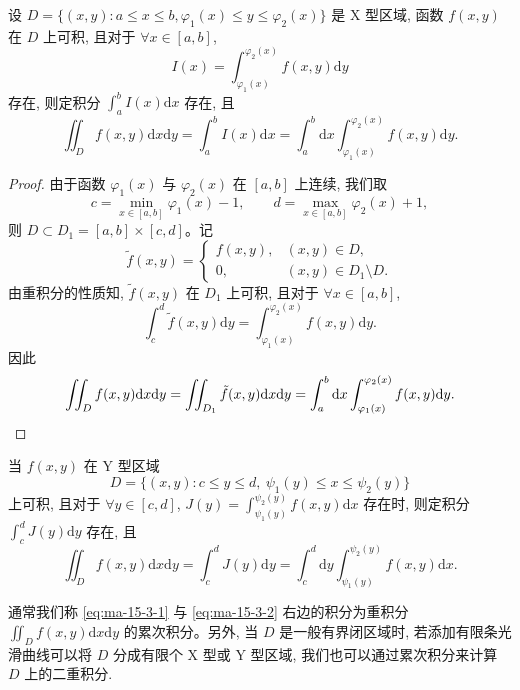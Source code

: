 \begin{theorem}\label{theorem:ma-15-3-2}
设 $D=\{(x,y):a\leqslant x\leqslant b,\varphi_1(x)\leqslant y\leqslant\varphi_2(x)\}$ 是 X 型区域, 函数 $f(x,y)$ 在 $D$ 上可积, 且对于 $\forall x\in[a,b]$,
\[
  I(x)=\int_{\varphi_1(x)}^{\varphi_2(x)}f(x,y)\mathrm dy
\]
存在, 则定积分 $\int_a^b I(x)\mathrm dx$ 存在, 且
\begin{equation}
  \iint_D f(x,y)\mathrm dx\mathrm dy
  =\int_a^b I(x)\mathrm dx
  =\int_a^b\mathrm dx\int_{\varphi_1(x)}^{\varphi_2(x)}f(x,y)\mathrm dy.
  \label{eq:ma-15-3-1}
\end{equation}
\end{theorem}


\begin{proof}
由于函数 $\varphi_1(x)$ 与 $\varphi_2(x)$ 在 $[a,b]$ 上连续, 我们取
\[
  c=\min_{x\in[a,b]}\varphi_1(x)-1,\qquad
  d=\max_{x\in[a,b]}\varphi_2(x)+1,
\]
则 $D\subset D_1=[a,b]\times[c,d]$。记
\[
  \tilde f(x,y)=
  \begin{cases}
    f(x,y), & (x,y)\in D,\\
    0, & (x,y)\in D_1\setminus D.
  \end{cases}
\]
由重积分的性质知, $\tilde f(x,y)$ 在 $D_1$ 上可积, 且对于 $\forall x\in[a,b]$,
\[
  \int_c^d\tilde f(x,y)\mathrm dy
  =\int_{\varphi_1(x)}^{\varphi_2(x)}f(x,y)\mathrm dy.
\]
因此
\[
  \iint_D f(x,y)\mathrm dx\mathrm dy
  =\iint_{D_1}\tilde f(x,y)\mathrm dx\mathrm dy
  =\int_a^b\mathrm dx\int_{\varphi_1(x)}^{\varphi_2(x)}f(x,y)\mathrm dy.
\qedhere
\]
\end{proof}


\begin{remark}\label{remark:ma-15-source-33}
当 $f(x,y)$ 在 Y 型区域
\[
  D=\{(x,y):c\leqslant y\leqslant d,\ \psi_1(y)\leqslant x\leqslant\psi_2(y)\}
\]
上可积, 且对于 $\forall y\in[c,d]$, $J(y)=\int_{\psi_1(y)}^{\psi_2(y)}f(x,y)\mathrm dx$ 存在时, 则定积分 $\int_c^dJ(y)\mathrm dy$ 存在, 且
\begin{equation}
  \iint_D f(x,y)\mathrm dx\mathrm dy
  =\int_c^dJ(y)\mathrm dy
  =\int_c^d\mathrm dy\int_{\psi_1(y)}^{\psi_2(y)}f(x,y)\mathrm dx.
  \label{eq:ma-15-3-2}
\end{equation}
\end{remark}

通常我们称 \eqref{eq:ma-15-3-1} 与 \eqref{eq:ma-15-3-2} 右边的积分为重积分 $\iint_D f(x,y)\mathrm dx\mathrm dy$ 的累次积分。另外, 当 $D$ 是一般有界闭区域时, 若添加有限条光滑曲线可以将 $D$ 分成有限个 X 型或 Y 型区域, 我们也可以通过累次积分来计算 $D$ 上的二重积分.

